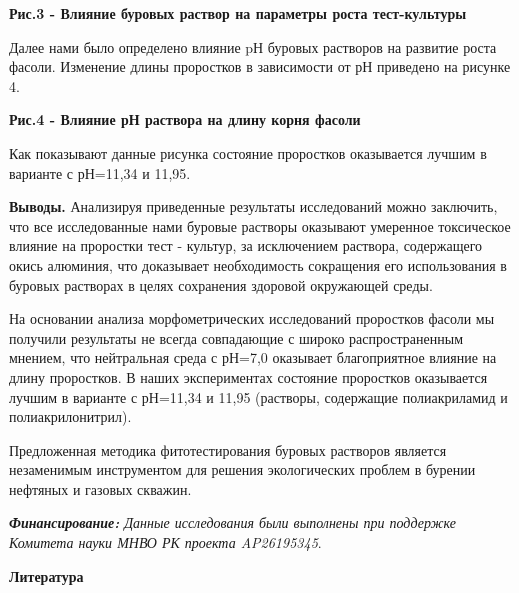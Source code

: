 {\bfseries Рис.3 - Влияние буровых раствор на параметры роста тест-культуры}

Далее нами было определено влияние pН буровых растворов на развитие
роста фасоли. Изменение длины проростков в зависимости от рН приведено
на рисунке 4.

{\bfseries Рис.4 - Влияние рН раствора на длину корня фасоли}

\begin{multicols}{2}
Как показывают данные рисунка состояние проростков оказывается лучшим в
варианте с рН=11,34 и 11,95.

{\bfseries Выводы.} Анализируя приведенные результаты исследований можно
заключить, что все исследованные нами буровые растворы оказывают
умеренное токсическое влияние на проростки тест - культур, за
исключением раствора, содержащего окись алюминия, что доказывает
необходимость сокращения его использования в буровых растворах в целях
сохранения здоровой окружающей среды.

На основании анализа морфометрических исследований проростков фасоли мы
получили результаты не всегда совпадающие с широко распространенным
мнением, что нейтральная среда с рН=7,0 оказывает благоприятное влияние
на длину проростков. В наших экспериментах состояние проростков
оказывается лучшим в варианте с рН=11,34 и 11,95 (растворы, содержащие
полиакриламид и полиакрилонитрил).

Предложенная методика фитотестирования буровых растворов является
незаменимым инструментом для решения экологических проблем в бурении
нефтяных и газовых скважин.

\emph{{\bfseries Финансирование:} Данные исследования были выполнены при
поддержке Комитета науки МНВО РК проекта AP26195345}.
\end{multicols}

\begin{center}
{\bfseries Литература}
\end{center}


